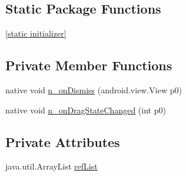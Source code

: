 \subsection*{Static Package Functions}
\begin{CompactItemize}
\item 
\hyperlink{classmono_1_1android_1_1support_1_1design_1_1widget_1_1_swipe_dismiss_behavior___on_dismiss_listener_implementor_ddd9d1403267f8e41f6795b308bc71a6}{\mbox{[}static initializer\mbox{]}}
\end{CompactItemize}
\subsection*{Private Member Functions}
\begin{CompactItemize}
\item 
native void \hyperlink{classmono_1_1android_1_1support_1_1design_1_1widget_1_1_swipe_dismiss_behavior___on_dismiss_listener_implementor_3cdd0629620d9e81af03e40f08d0bd9d}{n\_\-onDismiss} (android.view.View p0)
\item 
native void \hyperlink{classmono_1_1android_1_1support_1_1design_1_1widget_1_1_swipe_dismiss_behavior___on_dismiss_listener_implementor_6eeed8a94e908f3ddcce2a55509d6129}{n\_\-onDragStateChanged} (int p0)
\end{CompactItemize}
\subsection*{Private Attributes}
\begin{CompactItemize}
\item 
java.util.ArrayList \hyperlink{classmono_1_1android_1_1support_1_1design_1_1widget_1_1_swipe_dismiss_behavior___on_dismiss_listener_implementor_38e4dd7bc6849d5a28ccc23f910a3dd5}{refList}
\end{CompactItemize}


